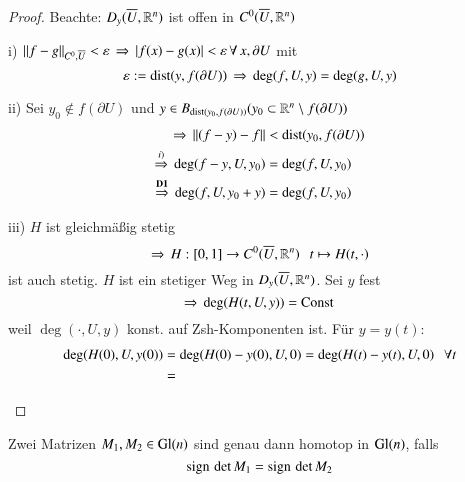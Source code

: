 \begin{proof}
    Beachte: $D_y(\overline U, \mathbb{R}^n)$ ist offen in $C^0(\overline U, \mathbb{R}^n)$
    \begin{description}
    \item{i)}
        $\|f-g\|_{C^0,\overline U} <\varepsilon \, \Rightarrow \, |f(x)-g(x)|<\varepsilon \, \forall \, x,\partial U$ mit
        \[
            \varepsilon:= \mathrm{dist}(y,f(\partial U)) \, \Rightarrow \, \deg (f,U,y)=\deg (g,U,y)
        \]
    \item{ii)}
        Sei $y_0\nin f(\partial U)$ und $y\in B_{\mathrm{dist}(y_0,f(\partial U))}(y_0\subset \mathbb{R}^n\setminus
                f(\partial U))$
        \begin{eqnarray*}
            \Rightarrow \, \|(f-y)-f\|&<\mathrm{dist}(y_0,f(\partial U))\\
                \overset{i)}{\Rightarrow} \, \deg(f-y,U,y_0) &= \deg(f,U,y_0)\\
            \overset{\textbf{D1}}{\Rightarrow } \, \deg (f,U,y_0+y)&= \deg(f,U,y_0)
        \end{eqnarray*}
    \item{iii)}
        $H$ ist gleichmäßig stetig
        \[
            \Rightarrow \, H:[0,1]\rightarrow C^0(\overline U,\mathbb{R}^n)\hspace{.25cm} t\mapsto H(t,\cdot)
        \]
        ist auch stetig. $H$ ist ein stetiger Weg in $D_y(\overline U,\mathbb{R}^n)$. Sei $y$ fest
        \[
            \Rightarrow \, \deg(H(t,U,y))=\mathrm{Const} \,
        \]
        weil $\deg(\cdot,U,y)$ konst. auf Zsh-Komponenten ist. Für $y=y(t):$
        \begin{align*}
            \deg(H(0),U,y(0))&=\deg(H(0)-y(0),U,0)=\deg(H(t)-y(t), U, 0) \hspace{.25cm} \forall t\\
            &=
        \end{align*}
    \end{description}
\end{proof}

\begin{lem}\label{1.3.5}
    Zwei Matrizen $M_1,M_2\in \mathrm{Gl}(n)$ sind genau dann homotop in $\mathrm{Gl}(n)$, falls
    \[
        \mathrm{sign}\, \det M_1 = \mathrm{sign}\,\det M_2
    \]
\end{lem}

